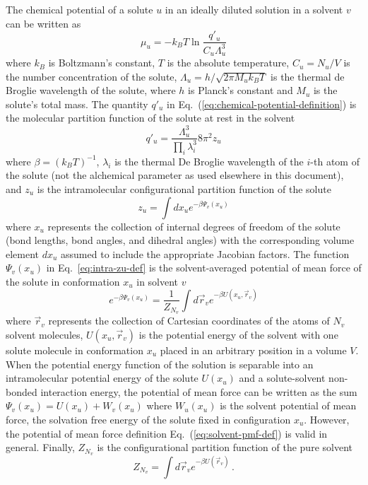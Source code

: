 \documentclass[9pt,bestpractices]{livecoms}
\begin{document}
The chemical potential of a solute $u$ in an ideally diluted solution in a solvent $v$ can be written as~\cite{guggenheim1952mixtures504,gilson1997statisticalthermodynamic,gilson2007calculation}
\begin{equation}
  \mu_u = -k_B T \ln \frac{q'_u}{C_u \Lambda_u^3}
  \label{eq:chemical-potential-definition}
\end{equation}
where $k_B$ is Boltzmann's constant, $T$ is the absolute temperature, $C_u = N_u/V$ is the number concentration of the solute, $\Lambda_u = h/\sqrt{2 \pi M_u k_B T}$ is the thermal de Broglie wavelength of the solute, where $h$ is Planck's constant and $M_u$ is the solute's total mass. The quantity $q'_u$ in Eq.~(\ref{eq:chemical-potential-definition}) is the molecular partition function of the solute at rest in the solvent
\begin{equation}
  q'_u = \frac{\Lambda_u^3}{\prod_i \lambda_i^3} 8 \pi^2 z_u
  \label{eq:intra-qpu-def}
\end{equation}
where $\beta = (k_B T)^{-1}$, $\lambda_i$ is the thermal De Broglie wavelength of the $i$-th atom of the solute (not the alchemical parameter as used elsewhere in this document), and $z_u$ is the intramolecular configurational partition function of the solute
\begin{equation}
  z_u = \int dx_u e^{-\beta \Psi_v(x_u)}
  \label{eq:intra-zu-def}
\end{equation}
where $x_u$ represents the collection of internal degrees of freedom of the solute (bond lengths, bond angles, and dihedral angles) with the corresponding volume element $dx_u$ assumed to include the appropriate Jacobian factors. The function $\Psi_v(x_u)$ in Eq.~\ref{eq:intra-zu-def} is the solvent-averaged potential of mean force of the solute in conformation $x_u$ in solvent $v$\cite{rouxandsimonson1999solventmodels} 
\begin{equation}
  e^{-\beta \Psi_v(x_u)} = \frac{1}{Z_{N_v}} \int d\vec{r}_v e^{-\beta U(x_u, \vec{r}_v)}
  \label{eq:solvent-pmf-def}
\end{equation}
where $\vec{r}_v$ represents the collection of Cartesian coordinates of the atoms of $N_v$ solvent molecules, $U(x_u, \vec{r}_v)$ is the potential energy of the solvent with one solute molecule in conformation $x_u$ placed in an arbitrary position in a volume $V$. When the potential energy function of the solution is separable into an intramolecular potential energy of the solute $U(x_u)$ and a solute-solvent non-bonded interaction energy, the potential of mean force can be written as the sum $\Psi_v(x_u) = U(x_u) + W_v(x_u)$ where $W_u(x_u)$ is the solvent potential of mean force, the solvation free energy of the solute fixed in configuration $x_u$\cite{gilson2007calculation}. However, the potential of mean force definition Eq.~(\ref{eq:solvent-pmf-def}) is valid in general. Finally, $Z_{N_v}$ is the configurational partition function of the pure solvent
\begin{equation}
  Z_{N_v} = \int d\vec{r}_v e^{-\beta U(\vec{r}_v)} \, .
  \label{eq:Z-pure-solvent}
\end{equation}
\end{document}
